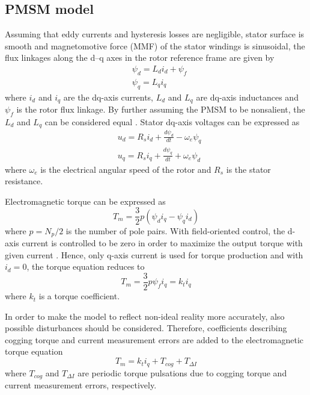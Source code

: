 \subsection{PMSM model} \label{PMSM model}
Assuming that eddy currents and hysteresis losses are negligible, stator surface is smooth and magnetomotive force (MMF) of the stator windings is sinusoidal, the flux linkages along the d–q axes in the rotor reference frame are given by \cite{Vector-control}
\begin{equation}
    \begin{split}
        & \psi_{d} = L_{d} i_{d} + \psi_f
        \\[2ex]
        & \psi_{q} = L_{q} i_{q}
    \end{split}
    \label{Eq:flux-linkages}
\end{equation}
where $i_d$ and $i_q$ are the dq-axis currents, $L_d$ and $L_q$ are dq-axis inductances and $\psi_f$ is the rotor flux linkage. By further assuming the PMSM to be nonsalient, the $L_d$ and $L_q$ can be considered equal \cite{ILC:2005}. Stator dq-axis voltages can be expressed as \cite{Vector-control}
\begin{equation}
    \begin{split}
        & u_{d} = R_s i_{d} + \frac{d \psi_{d}}{dt} - \omega_e \psi_{q} 
        \\[2ex]
        & u_{q} = R_s i_{q} + \frac{d \psi_{q}}{dt} + \omega_e \psi_{d}
    \end{split}
     \label{Eq:voltage}
\end{equation}
where $\omega_e$ is the electrical angular speed of the rotor and $R_s$ is the stator resistance.

Electromagnetic torque can be expressed as \cite{Vector-control, ILC:2012, ILC:2018}
\begin{equation}
    T_m = \frac{3}{2}p(\psi_{d} i_{q} - \psi_{q} i_{d})
    \label{torque_eq}
\end{equation}
where $p = N_p/2$ is the number of pole pairs. With field-oriented control, the d-axis current is controlled to be zero in order to maximize the output torque with given current \cite{ILC:2012, Vector-control}. Hence, only q-axis current is used for torque production and with $i_{d} = 0$, the torque equation reduces to
\begin{equation}
    T_m = \frac{3}{2}p \psi_f i_{q} = k_t i_{q}
    \label{torque_eq2}
\end{equation}
where $k_t$ is a torque coefficient.

In order to make the model to reflect non-ideal reality more accurately, also possible disturbances should be considered. Therefore, coefficients describing cogging torque and current measurement errors are added to the electromagnetic torque equation \cite{ILC:2004}
\begin{equation}
    T_m = k_t i_{q} + T_{cog} + T_{\Delta I}
    \label{torque_eq3}
\end{equation}
where $T_{cog}$ and $T_{\Delta I}$ are periodic torque pulsations due to cogging torque and current measurement errors, respectively.

